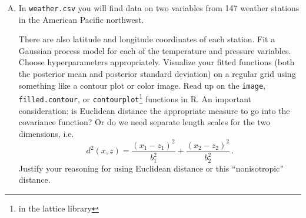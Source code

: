 \documentclass[11pt]{article}
\begin{document}
\begin{enumerate}[(A)]
\item In \verb|weather.csv| you will find data on two variables from 147 weather stations in the American Pacific northwest.
There are also latitude and longitude coordinates of each  station.  Fit a Gaussian process model for each of the temperature and pressure variables.  Choose hyperparameters appropriately.  Visualize your fitted functions (both the posterior mean and posterior standard deviation) on a regular grid using something like a contour plot or color image.  Read up on the \verb|image|, \verb|filled.contour|, or \verb|contourplot|\footnote{in the lattice library} functions in R.  An important consideration: is Euclidean distance the appropriate measure to go into the covariance function?  Or do we need separate length scales for the two dimensions, i.e.
$$
d^2(x, z) = \frac{(x_1 - z_1)^2}{b_1^2} +  \frac{(x_2 - z_2)^2}{b_2^2} \, .
$$
Justify your reasoning for using Euclidean distance or this ``nonisotropic'' distance.


%
%

\end{enumerate}
\end{document}
